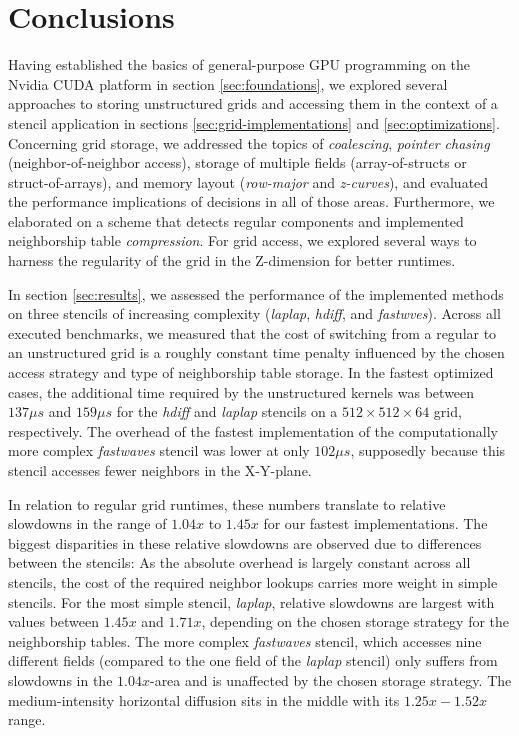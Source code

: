 \chapter{Conclusions}

Having established the basics of general-purpose GPU programming on the Nvidia CUDA platform in section \ref{sec:foundations}, we explored several approaches to storing unstructured grids and accessing them in the context of a stencil application in sections \ref{sec:grid-implementations} and \ref{sec:optimizations}. Concerning grid storage, we addressed the topics of \emph{coalescing}, \emph{pointer chasing} (neighbor-of-neighbor access), storage of multiple fields (array-of-structs or struct-of-arrays), and memory layout (\emph{row-major} and \emph{z-curves}), and evaluated the performance implications of decisions in all of those areas. Furthermore, we elaborated on a scheme that detects regular components and implemented neighborship table \emph{compression}. For grid access, we explored several ways to harness the regularity of the grid in the Z-dimension for better runtimes.

In section \ref{sec:results}, we assessed the performance of the implemented methods on three stencils of increasing complexity (\emph{laplap}, \emph{hdiff}, and \emph{fastwves}). Across all executed benchmarks, we measured that the cost of switching from a regular to an unstructured grid is a roughly constant time penalty influenced by the chosen access strategy and type of neighborship table storage. In the fastest optimized cases, the additional time required by the unstructured kernels was between $137 \mu s$ and $159 \mu s$ for the \emph{hdiff} and \emph{laplap} stencils on a $512\times 512\times 64$ grid, respectively. The overhead of the fastest implementation of the computationally more complex \emph{fastwaves} stencil was lower at only $102 \mu s$, supposedly because this stencil accesses fewer neighbors in the X-Y-plane.

In relation to regular grid runtimes, these numbers translate to relative slowdowns in the range of $1.04x$ to $1.45x$ for our fastest implementations. The biggest disparities in these relative slowdowns are observed due to differences between the stencils: As the absolute overhead is largely constant across all stencils, the cost of the required neighbor lookups carries more weight in simple stencils. For the most simple stencil, \emph{laplap}, relative slowdowns are largest with values between $1.45x$ and $1.71x$, depending on the chosen storage strategy for the neighborship tables. The more complex \emph{fastwaves} stencil, which accesses nine different fields (compared to the one field of the \emph{laplap} stencil) only suffers from slowdowns in the $1.04x$-area and is unaffected by the chosen storage strategy. The medium-intensity horizontal diffusion sits in the middle with its $1.25x - 1.52x$ range. 


